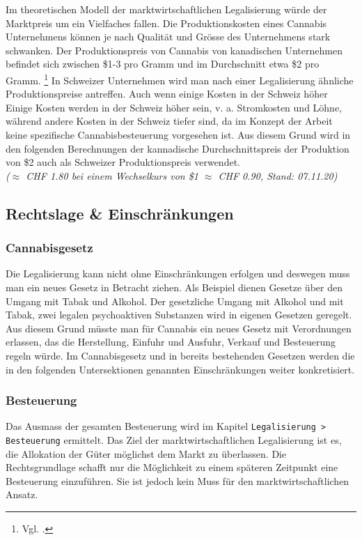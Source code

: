 \documentclass[../main.tex]{subfiles}
\begin{document}
	 \noindent
	 Im theoretischen Modell der marktwirtschaftlichen Legalisierung würde der Marktpreis um ein Vielfaches fallen.
	 Die Produktionskosten eines Cannabis Unternehmens können je nach Qualität und Grösse des Unternehmens stark schwanken.
	 Der Produktionspreis von Cannabis von kanadischen Unternehmen befindet sich zwischen \$1-3 pro Gramm und im Durchschnitt etwa \$2 pro Gramm.%
	 \footnote{Vgl. \cite{seekingalpha-01}.}
	 In Schweizer Unternehmen wird man nach einer Legalisierung ähnliche Produktionspreise antreffen. 
	 Auch wenn einige Kosten in der Schweiz höher
	 Einige Kosten werden in der Schweiz höher sein, v. a. Stromkosten und Löhne, während andere Kosten in der Schweiz tiefer sind, da im Konzept der Arbeit keine spezifische Cannabisbesteuerung vorgesehen ist.
	 Aus diesem Grund wird in den folgenden Berechnungen der kannadische Durchschnittspreis der Produktion von \$2 auch als Schweizer Produktionspreis verwendet.\\
	 \textit{($\approx$ CHF 1.80 bei einem Wechselkurs von \$1 $\approx$ CHF 0.90, Stand: 07.11.20)}
	 

	 \pagebreak	 
	 
	 \subsection{Rechtslage \& Einschränkungen}
	 
	 \subsubsection{Cannabisgesetz}
	 Die Legalisierung kann nicht ohne Einschränkungen erfolgen und deswegen muss man ein neues Gesetz in Betracht ziehen.
	 Als Beispiel dienen Gesetze über den Umgang mit Tabak und Alkohol.
	 Der gesetzliche Umgang mit Alkohol und mit Tabak, zwei legalen psychoaktiven Substanzen wird in eigenen Gesetzen geregelt. 
	 Aus diesem Grund müsste man für Cannabis ein neues Gesetz mit Verordnungen erlassen, das die Herstellung, Einfuhr und Ausfuhr, Verkauf und Besteuerung regeln würde.	 
	 Im Cannabisgesetz und in bereits bestehenden Gesetzen werden die in den folgenden Untersektionen genannten Einschränkungen weiter konkretisiert.
	 
	 \subsubsection{Besteuerung}
	 Das Ausmass der gesamten Besteuerung wird im Kapitel \texttt{Legalisierung > Besteuerung} ermittelt.
	 Das Ziel der marktwirtschaftlichen Legalisierung ist es, die Allokation der Güter möglichst dem Markt zu überlassen.
	 Die Rechtsgrundlage schafft nur die Möglichkeit zu einem späteren Zeitpunkt eine Besteuerung einzuführen. 
	 Sie ist jedoch kein Muss für den marktwirtschaftlichen Ansatz.\\
	 
\end{document}
